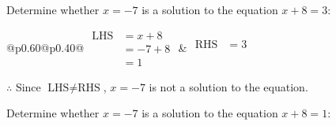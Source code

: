 \documentclass[12pt]{article}
\newcounter{minipagecount}
\begin{document}
\begin{multicols}{2}
\begin{minipage}[t]{0.40\textwidth}
    \noindent Determine whether \(x = -7\) is a solution to the equation \(x + 8 = 3\):
    \vspace{4pt}  %

    \noindent
    \renewcommand{\arraystretch}{1.3} %
    \begin{tabular}{@{}p{0.60\linewidth}@{}p{0.40\linewidth}@{}}
        \(\begin{aligned}
            \text{LHS} &= x + 8 \\
                    &= -7 + 8 \\
                    &= 1
        \end{aligned}\) &
        \(\begin{aligned}
            \text{RHS} &= 3\\
                    & \\
                    &
        \end{aligned}\)
    \end{tabular}
    \renewcommand{\arraystretch}{1.0} %
    \vspace{2pt}  %

    \noindent \(\therefore\) Since \(\text{LHS} \neq \text{RHS}\), \(x = -7\) is not  a solution to the equation.

\end{minipage}

 \vspace*{16pt}
\noindent{(\theminipagecount)}\hspace{0.1mm} %
\begin{minipage}[t]{0.40\textwidth} %

    \noindent Determine whether \(x = -7\) is a solution to the equation \(x + 8 = 1\):
    \vspace{4pt}  %


\end{minipage}
\end{multicols}
\end{document}
